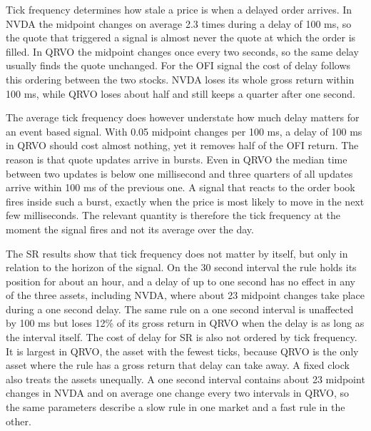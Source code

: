 \documentclass{article}
\begin{document}
Tick frequency determines how stale a price is when a delayed order arrives. In NVDA the midpoint changes on average 2.3 times during a delay of 100 ms, so the quote that triggered a signal is almost never the quote at which the order is filled. In QRVO the midpoint changes once every two seconds, so the same delay usually finds the quote unchanged. For the OFI signal the cost of delay follows this ordering between the two stocks. NVDA loses its whole gross return within 100 ms, while QRVO loses about half and still keeps a quarter after one second.
 
The average tick frequency does however understate how much delay matters for an event based signal. With 0.05 midpoint changes per 100 ms, a delay of 100 ms in QRVO should cost almost nothing, yet it removes half of the OFI return. The reason is that quote updates arrive in bursts. Even in QRVO the median time between two updates is below one millisecond and three quarters of all updates arrive within 100 ms of the previous one. A signal that reacts to the order book fires inside such a burst, exactly when the price is most likely to move in the next few milliseconds. The relevant quantity is therefore the tick frequency at the moment the signal fires and not its average over the day.
 
The SR results show that tick frequency does not matter by itself, but only in relation to the horizon of the signal. On the 30 second interval the rule holds its position for about an hour, and a delay of up to one second has no effect in any of the three assets, including NVDA, where about 23 midpoint changes take place during a one second delay. The same rule on a one second interval is unaffected by 100 ms but loses 12\% of its gross return in QRVO when the delay is as long as the interval itself. The cost of delay for SR is also not ordered by tick frequency. It is largest in QRVO, the asset with the fewest ticks, because QRVO is the only asset where the rule has a gross return that delay can take away. A fixed clock also treats the assets unequally. A one second interval contains about 23 midpoint changes in NVDA and on average one change every two intervals in QRVO, so the same parameters describe a slow rule in one market and a fast rule in the other.
 
\end{document}

